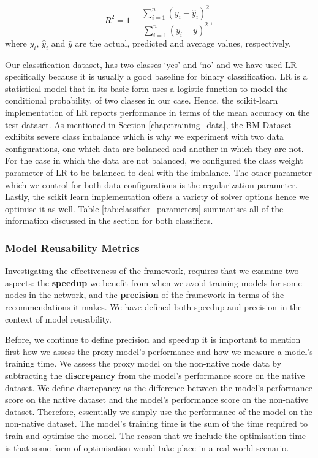 \documentclass{mpaper}
\begin{document}
\begin{equation}
    R^{2} = 1 - \frac{\sum_{i=1}^{n}(y_{i}-\hat{y}_{i})^{2}}{\sum_{i=1}^{n}(y_{i}-\bar{y})^{2}},
\end{equation}
where $y_{i}$, $\hat{y}_{i}$ and $\bar{y}$ are the actual, predicted and average values, respectively. 

Our classification dataset, has two classes `yes' and `no' and we have used LR \cite{OriginalLR} specifically because it is usually a good baseline for binary classification. LR \cite{OriginalLR} is a statistical model that in its basic form uses a logistic function to model the conditional probability, of two classes in our case. Hence, the scikit-learn implementation of LR reports performance in terms of the mean accuracy on the test dataset. As mentioned in Section \ref{chap:training_data}, the BM Dataset exhibits severe class imbalance which is why we experiment with two data configurations, one which data are balanced and another in which they are not. For the case in which the data are not balanced, we configured the class weight parameter of LR to be balanced to deal with the imbalance. The other parameter which we control for both data configurations is the regularization parameter. Lastly, the scikit learn implementation offers a variety of solver options hence we optimise it as well. Table \ref{tab:classifier_parameters} summarises all of the information discussed in the section for both classifiers. 

\subsubsection{Model Reusability Metrics}\label{chap:metrics}

Investigating the effectiveness of the framework, requires that we examine two aspects: the \textbf{speedup} we benefit from when we avoid training models for some nodes in the network, and the \textbf{precision} of the framework in terms of the recommendations it makes. We have defined both speedup and precision in the context of model reusability.

Before, we continue to define precision and speedup it is important to mention first how we assess the proxy model's performance and how we measure a model's training time. We assess the proxy model on the non-native node data by subtracting the \textbf{discrepancy} from the model's performance score on the native dataset. We define discrepancy as the difference between the model's performance score on the native dataset and the model's performance score on the non-native dataset. Therefore, essentially we simply use the performance of the model on the non-native dataset. The model's training time is the sum of the time required to train and optimise the model. The reason that we include the optimisation time is that some form of optimisation would take place in a real world scenario.
\end{document}
